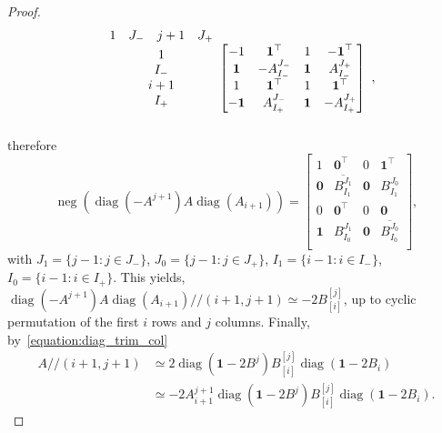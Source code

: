 \documentclass[10pt,a4paper]{amsart}
\DeclareMathOperator{\diag}{diag}
\DeclareMathOperator{\nega}{neg}
\DeclareMathOperator{\supp}{supp}
\newcommand{\trim}{/\!\!/}
\begin{document}
\begin{proof}
$$\begin{array}{c@{}c}
\begin{array}{cccc}
	1 & J_-& j+1 & J_+
\end{array}\\
\begin{array}{c}
	1\\I_- \\ i+1 \\ I_+
\end{array} &\begin{bmatrix}
	-1 & \mathbf{1}^\top & 1 & \mathbf{-1}^\top \\
	\mathbf{1} & -A_{I_-}^{J_-} & \mathbf{1} & A_{I_-}^{J_+}\\
	1& \mathbf{1}^\top &1&\mathbf{1}^\top\\ 
	\mathbf{-1}& A_{I_+}^{J_-} & \mathbf{1} & -A_{I_+}^{J_+}
\end{bmatrix}\\&\end{array},$$
therefore 
$$\nega (\diag(-A^{j+1})A\diag(A_{i+1})) =\begin{bmatrix}
1 &\mathbf{0}^\top & 0& \mathbf{1}^\top\\
\mathbf{0} & \overline{B_{I_1}^{J_1}} &\mathbf{0}& {B_{I_1}^{J_0}} \\
0 & \mathbf{0}^\top & 0 &\mathbf{0}\\
\mathbf{1} & {B_{I_0}^{J_1}} &\mathbf{0}& \overline{B_{I_0}^{J_0}} \\
\end{bmatrix},$$
with $J_1 = \{j-1\colon j\in J_-\}$, $J_0 = \{j-1\colon j\in J_+\}$, $I_1 = \{i-1\colon i\in I_-\}$, $I_0 = \{i-1\colon i\in I_+\}$.
This yields, $\diag(-A^{j+1})A\diag(A_{i+1})\trim(i+1,j+1) \simeq -2 B_{[i]}^{[j]}$, up to cyclic permutation of the first $i$ rows and $j$ columns.
Finally, by~\eqref{equation:diag_trim_col} \begin{align*}
A\trim(i+1,j+1) &\simeq 2 \diag(\mathbf{1} -2 B^j) B_{[i]}^{[j]}\diag(\mathbf{1}-2 B_i)\\
& \simeq -2 A_{i+1}^{j+1} \diag(\mathbf{1} -2 B^j) B_{[i]}^{[j]}\diag(\mathbf{1}-2 B_i).
\end{align*}







\end{proof}
\end{document}

